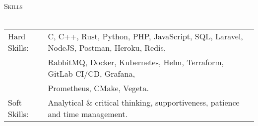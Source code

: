 \documentclass[a4paper]{article}
\newcommand{\lineunder} {
    \vspace*{-8pt} \\
    \hspace*{-18pt} \hrulefill \\
}
\newcommand{\header} [1] {
    {\hspace*{-18pt}\vspace*{6pt} \textsc{#1}}
    \vspace*{-6pt} \lineunder
}
\begin{document}

\header{Skills}
\begin{tabular}{ l l }
	Hard Skills:              & C, C++, Rust, Python, PHP, JavaScript, SQL, Laravel, NodeJS, Postman, Heroku, Redis, \\ & RabbitMQ, Docker, Kubernetes, Helm, Terraform, GitLab CI/CD, Grafana, \\ & Prometheus, CMake, Vegeta.\\
	Soft Skills:                    & Analytical \& critical thinking, supportiveness, patience and time management.\\
\end{tabular}
\vspace{2mm}

\ 
\end{document}
